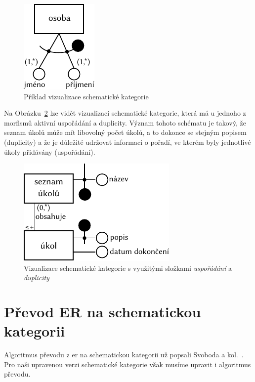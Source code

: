 \begin{figure}[!htb]
  \centering
  \includegraphics[width=\maxwidth{\textwidth}]{../img/schemcat-diagrams/schemcat-visualization-example.pdf}
  \caption{Příklad vizualizace schematické kategorie}
  \label{fig:schemcat-visualization-example}
\end{figure}

Na Obrázku~\ref{fig:scv-ord-dup} lze vidět vizualizaci schematické kategorie, která má u jednoho z morfismů aktivní uspořádání a duplicity.
Význam tohoto schématu je takový, že seznam úkolů může mít libovolný počet úkolů, a to dokonce se stejným popisem (duplicity) a že je důležité udržovat informaci o pořadí, ve kterém byly jednotlivé úkoly přidávány (uspořádání).

\begin{figure}[!htb]
  \centering
  \includegraphics[width=\maxwidth{\textwidth}]{../img/schemcat-diagrams/scv-ord-dup.pdf}
  \caption{Vizualizace schematické kategorie s využitými složkami \emph{uspořádání} a \emph{duplicity}}
  \label{fig:scv-ord-dup}
\end{figure}

\section{Převod ER na schematickou kategorii}

Algoritmus převodu z \acrshort{er} na schematickou kategorii už popsali Svoboda a kol.~\cite[s.~192-196]{svoboda_categorical_2021}.
Pro naši upravenou verzi schematické kategorie však musíme upravit i algoritmus převodu.

